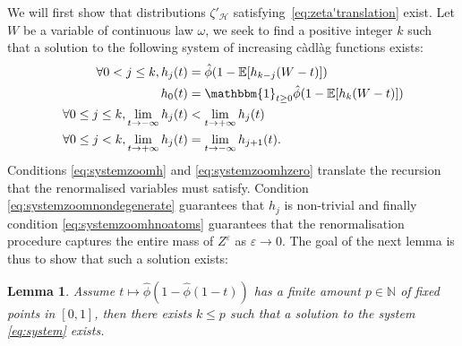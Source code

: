 \documentclass[11pt]{article}
\newtheorem{lemma}[prop]{Lemma}
\newcommand{\eps}{\varepsilon}
\begin{document}
We will first show that distributions $\zeta'_{\mathcal H}$ satisfying~\eqref{eq:zeta'translation} exist. Let $W$ be a variable of continuous law $\omega$, we seek to find  a positive integer $k$ such that a solution to the following system of increasing c\`adl\`ag functions exists:
\begin{subequations} \label{eq:system}
\begin{align}
    \forall 0 < j \leq k, h_j(t)&= \hat{\phi}(1-\mathbb{E}[h_{{k-j}}(W-t)])\label{eq:systemzoomh} \\
    h_0(t)&= \mathbbm{1}_{t \geq 0} \hat{\phi}(1-\mathbb{E}[h_{k}(W-t)])\label{eq:systemzoomhzero}\\
    \forall 0 \leq j \leq k, \lim_{t \rightarrow -\infty} h_j(t) &< \lim_{t \rightarrow + \infty}h_j(t) \label{eq:systemzoomnondegenerate} \\
    \forall 0 \leq j < k, \lim_{t \rightarrow + \infty}h_j(t) &= \lim_{t \rightarrow -\infty}h_{j+1}(t). \label{eq:systemzoomhnoatoms}
\end{align}
\end{subequations}
Conditions \eqref{eq:systemzoomh} and \eqref{eq:systemzoomhzero} translate the recursion that the renormalised variables must satisfy. Condition \eqref{eq:systemzoomnondegenerate} guarantees that $h_j$ is non-trivial and finally condition \eqref{eq:systemzoomhnoatoms} guarantees that the renormalisation procedure captures the entire mass of $Z^\eps$ as $\eps \rightarrow 0$.
The goal of the next lemma is thus to show that such a solution exists:
\begin{lemma}\label{prop:distributionzoom}
    Assume $t \mapsto \hat{\phi}(1-\hat{\phi}(1-t))$ has a finite amount $p \in \mathbb{N}$ of fixed points in $[0,1]$, then there exists $k \leq p $ such that a solution to the system \eqref{eq:system} exists.
\end{lemma}
\end{document}
